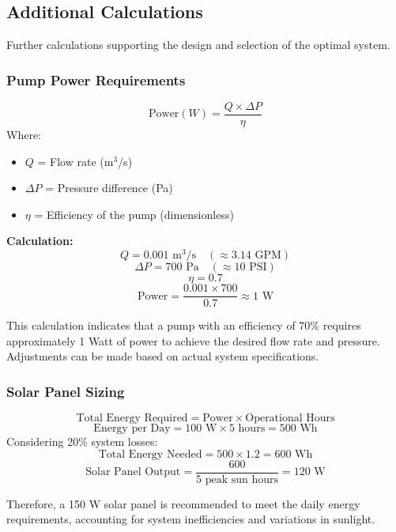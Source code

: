 \documentclass[12pt]{article}
\begin{document}
    
    \subsection{Additional Calculations}
    Further calculations supporting the design and selection of the optimal system.

    \subsubsection{Pump Power Requirements}
    \[
    \text{Power} (W) = \frac{Q \times \Delta P}{\eta}
    \]
    Where:
    \begin{itemize}
        \item \( Q \) = Flow rate (m\(^3\)/s)
        \item \( \Delta P \) = Pressure difference (Pa)
        \item \( \eta \) = Efficiency of the pump (dimensionless)
    \end{itemize}
    
    \textbf{ Calculation:}
    \[
    Q = 0.001 \text{ m}^3/\text{s} \quad (\approx 3.14 \text{ GPM})
    \]
    \[
    \Delta P = 700 \text{ Pa} \quad (\approx 10 \text{ PSI})
    \]
    \[
    \eta = 0.7
    \]
    \[
    \text{Power} = \frac{0.001 \times 700}{0.7} \approx 1 \text{ W}
    \]
    
    This calculation indicates that a pump with an efficiency of 70\% requires approximately 1 Watt of power to achieve the desired flow rate and pressure. Adjustments can be made based on actual system specifications.

    \subsubsection{Solar Panel Sizing}
    \[
    \text{Total Energy Required} = \text{Power} \times \text{Operational Hours}
    \]
    \[
    \text{Energy per Day} = 100 \text{ W} \times 5 \text{ hours} = 500 \text{ Wh}
    \]
    Considering 20\% system losses:
    \[
    \text{Total Energy Needed} = 500 \times 1.2 = 600 \text{ Wh}
    \]
    \[
    \text{Solar Panel Output} = \frac{600}{5 \text{ peak sun hours}} = 120 \text{ W}
    \]
    
    Therefore, a 150 W solar panel is recommended to meet the daily energy requirements, accounting for system inefficiencies and variations in sunlight.
\end{document}
